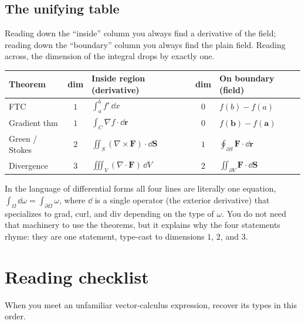 \documentclass{essay}
\newcommand{\F}{\mathbf{F}}
\begin{document}
\subsection{The unifying table}

Reading down the ``inside'' column you always find a derivative of the field; reading
down the ``boundary'' column you always find the plain field. Reading across, the
dimension of the integral drops by exactly one.

\begin{center}
\renewcommand{\arraystretch}{1.5}
\begin{tabular}{@{}l c l c l@{}}
\toprule
\textbf{Theorem} & \textbf{dim} & \textbf{Inside region (derivative)} & \textbf{dim} & \textbf{On boundary (field)} \\
\midrule
FTC               & $1$ & $\displaystyle\int_a^b f'\,\dd x$ & $0$ & $f(b)-f(a)$ \\
Gradient thm      & $1$ & $\displaystyle\int_C \nabla f\cdot\dd\mathbf{r}$ & $0$ & $f(\mathbf{b})-f(\mathbf{a})$ \\
Green / Stokes    & $2$ & $\displaystyle\iint_S (\nabla\times\F)\cdot\dd\mathbf{S}$ & $1$ & $\displaystyle\oint_{\partial S}\F\cdot\dd\mathbf{r}$ \\
Divergence        & $3$ & $\displaystyle\iiint_V (\nabla\cdot\F)\,\dd V$ & $2$ & $\displaystyle\iint_{\partial V}\F\cdot\dd\mathbf{S}$ \\
\bottomrule
\end{tabular}
\end{center}

In the language of differential forms all four lines are literally one equation,
$\int_{\Omega} \dd\omega = \int_{\partial\Omega}\omega$, where $\dd$ is a single
operator (the exterior derivative) that specializes to grad, curl, and div depending
on the type of $\omega$. You do not need that machinery to use the theorems, but it
explains why the four statements rhyme: they are one statement, type-cast to
dimensions $1$, $2$, and $3$.

\section{Reading checklist}

When you meet an unfamiliar vector-calculus expression, recover its types in this
order.
\end{document}
